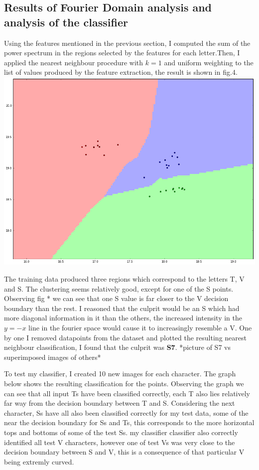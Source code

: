 \documentclass[a4paper,12px,twocolumn]{article}
\begin{document}
\begin{flushleft}
\section{Results of Fourier Domain analysis and analysis of the classifier}
    Using the features mentioned in the previous section, I computed the sum of the power spectrum in the regions selected
    by the features for each letter.Then, I applied the nearest neighbour procedure with $k=1$ and uniform weighting to the list of
    values produced by the feature extraction, the result is shown in fig.4.
    \includegraphics[scale=0.25]{decision}



    The training data produced three regions which correspond to the letters T, V and S. The clustering seems relatively good, except for
    one of the S points. Observing fig * we can see that one S value is far closer to the V decision boundary than the rest. I reasoned that
    the culprit would be an S which had more diagonal information in it than the others, the increased intensity in the $y = -x$ line in the fourier
    space would cause it to increasingly resemble a V. One by one I removed datapoints from the dataset and plotted the resulting nearest neighbour
    classification, I found that the culprit was \textbf{S7}.
    *picture of S7 vs superimposed images of others*

    \bigskip

    To test my classifier, I created 10 new images for each character. The graph below shows the resulting classification for the points. Observing the graph
    we can see that all input Ts have been classified correctly, each T also lies relatively far way from the decision boundary between T and S. Considering
    the next character, Ss have all also been classified correctly for my test data, some of the near the decision boundary for Ss and Ts, this corresponds
    to the more horizontal tops and bottoms of some of the test Ss. my classifier classifier also correctly identified all test V characters, however
    one of test Vs was very close to the decision boundary between S and V, this is a consequence of that particular V being extremly curved.


\end{flushleft}
\end{document}
